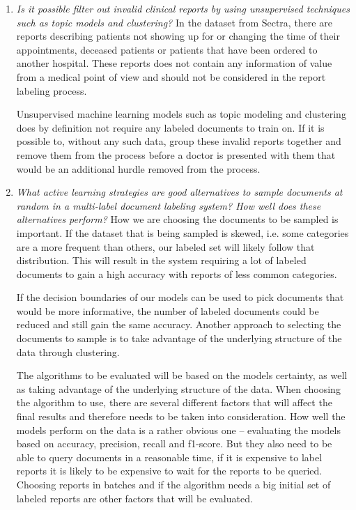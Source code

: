 \begin{enumerate}

\item \textit{Is it possible filter out invalid clinical reports by using unsupervised techniques such as topic models and clustering?}
      \newline
      In the dataset from Sectra, there are reports describing patients not showing up for or changing the time of their appointments, deceased patients or patients that have been ordered to another hospital.
      These reports does not contain any information of value from a medical point of view and should not be considered in the report labeling process.

      Unsupervised machine learning models such as topic modeling and clustering does by definition not require any labeled documents to train on.
      If it is possible to, without any such data, group these invalid reports together and remove them from the process before a doctor is presented with them that would be an additional hurdle removed from the process.

\item \label{intro:re-q2} 
      \textit{What active learning strategies are good alternatives to sample documents at random in a multi-label document labeling system? How well does these alternatives perform?}
      \newline
      How we are choosing the documents to be sampled is important.
      If the dataset that is being sampled is skewed, i.e. some categories are a more frequent than others, our labeled set will likely follow that distribution.
      This will result in the system requiring a lot of labeled documents to gain a high accuracy with reports of less common categories.

      If the decision boundaries of our models can be used to pick documents that would be more informative, the number of labeled documents could be reduced and still gain the same accuracy.
      Another approach to selecting the documents to sample is to take advantage of the underlying structure of the data through clustering.

      The algorithms to be evaluated will be based on the models certainty, as well as taking advantage of the underlying structure of the data.
      When choosing the algorithm to use, there are several different factors that will affect the final results and therefore needs to be taken into consideration.
      How well the models perform on the data is a rather obvious one -- evaluating the models based on accuracy, precision, recall and f1-score.
      But they also need to be able to query documents in a reasonable time, if it is expensive to label reports it is likely to be expensive to wait for the reports to be queried.
      Choosing reports in batches and if the algorithm needs a big initial set of labeled reports are other factors that will be evaluated.


\end{enumerate}
